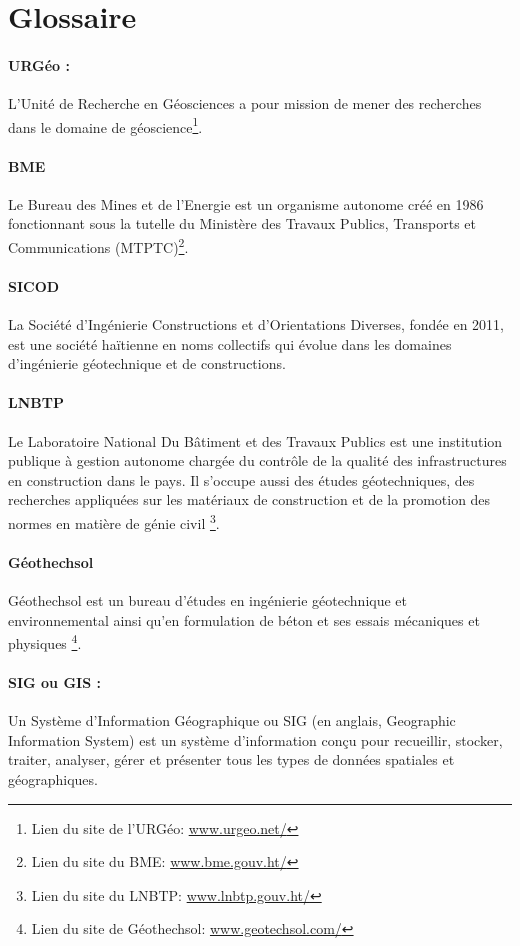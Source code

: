 \section{Glossaire}
\paragraph{URGéo :}
L'Unité de Recherche en Géosciences a pour mission de mener des
recherches dans le domaine de géoscience\footnote{Lien du site de l'URGéo: \url{www.urgeo.net/}}.




\paragraph{BME}
Le Bureau des Mines et de l’Energie est un organisme autonome créé en 
1986 fonctionnant sous la tutelle du Ministère des Travaux Publics, Transports 
et Communications (MTPTC)\footnote{Lien du site du BME: \url{www.bme.gouv.ht/}}. 


\paragraph{SICOD}
La  Société d’Ingénierie Constructions et d’Orientations Diverses,
fondée en 2011, est une société haïtienne en noms collectifs qui évolue dans 
les domaines d’ingénierie géotechnique et de constructions.

\paragraph{LNBTP}
Le Laboratoire National Du Bâtiment et des Travaux Publics est une institution 
publique à gestion autonome chargée du contrôle de
la qualité des infrastructures en construction dans le pays. Il s'occupe 
aussi des études géotechniques, des recherches appliquées sur les matériaux de 
construction et de la promotion des normes en matière de génie civil
\footnote{Lien du site du LNBTP: \url{www.lnbtp.gouv.ht/}}. 


\paragraph{Géothechsol}
Géothechsol est un bureau d’études 
en ingénierie géotechni\-que et environnemental
ainsi qu’en formulation de béton et ses essais mécani\-ques et physiques
\footnote{Lien du site de Géothechsol: \url{www.geotechsol.com/}}.  

\paragraph{SIG ou GIS :}  
Un Système d'Information Géographique ou SIG (en anglais, Geographic 
Information System) est un système d'information conçu pour 
recueillir, stocker, traiter, analyser, gérer et présenter tous les 
types de données spatiales et géographiques. 


